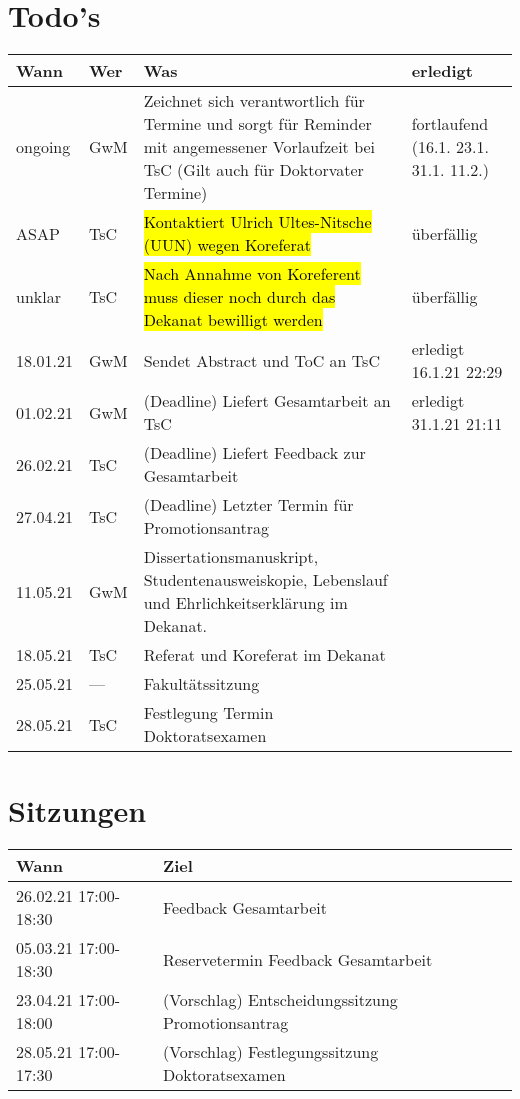 \documentclass[a4paper,10pt,english]{extarticle}
\begin{document}
\section{Todo's}
\begin{tabular}{|l|l|l|p{5cm}|}\hline
	Wann & Wer & Was & erledigt\\\hline
	ongoing & GwM & Zeichnet sich verantwortlich für Termine und sorgt für Reminder mit angemessener Vorlaufzeit bei TsC (Gilt auch für Doktorvater Termine) &fortlaufend (16.1. 23.1. 31.1. 11.2.)\\
	ASAP    & TsC & \hl{Kontaktiert Ulrich Ultes-Nitsche (UUN) wegen Koreferat}                          & überfällig\\
	unklar  & TsC & \hl{Nach Annahme von Koreferent muss dieser noch durch das Dekanat bewilligt werden} & überfällig\\
	18.01.21& GwM & Sendet Abstract und ToC an TsC												         & erledigt 16.1.21 22:29\\
	01.02.21& GwM & (Deadline) Liefert Gesamtarbeit an TsC										         & erledigt 31.1.21 21:11\\
	26.02.21& TsC & (Deadline) Liefert Feedback zur Gesamtarbeit                                         &\\
	27.04.21& TsC & (Deadline) Letzter Termin für Promotionsantrag                                       &\\
	11.05.21& GwM & Dissertationsmanuskript, Studentenausweiskopie, Lebenslauf und Ehrlichkeitserklärung im Dekanat.&\\
	18.05.21& TsC & Referat und Koreferat im Dekanat                                                     &\\
	25.05.21& --- & Fakultätssitzung                                                                     &\\
	28.05.21& TsC & Festlegung Termin Doktoratsexamen                                                    &\\\hline
\end{tabular}

\section{Sitzungen}
\begin{tabular}{|l|l|}\hline
	Wann                 & Ziel\\\hline
	26.02.21 17:00-18:30 & Feedback Gesamtarbeit\\
	05.03.21 17:00-18:30 & Reservetermin Feedback Gesamtarbeit\\
	23.04.21 17:00-18:00 & (Vorschlag) Entscheidungssitzung Promotionsantrag\\
	28.05.21 17:00-17:30 & (Vorschlag) Festlegungssitzung Doktoratsexamen\\
	\hline
\end{tabular}
\end{document}
